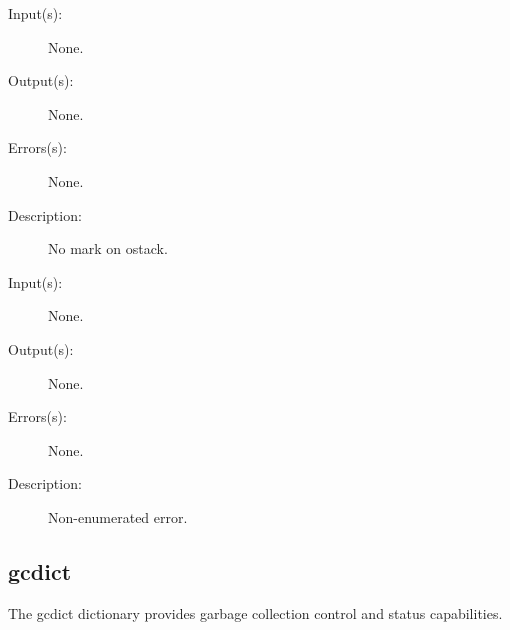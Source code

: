 \begin{description}
\begin{description}
	\item[Input(s): ] None.
	\item[Output(s): ] None.
	\item[Errors(s): ] None.
	\item[Description: ]
		No mark on ostack.
	\end{description}
\label{unregistered}
\label{errordict:unregistered}
\item[{\onyxop{--}{unregistered}{--}}: ]
	\begin{description}\item[]
	\item[Input(s): ] None.
	\item[Output(s): ] None.
	\item[Errors(s): ] None.
	\item[Description: ]
		Non-enumerated error.
	\end{description}
\end{description}

\subsection{gcdict}
\label{sec:gcdict}

The gcdict dictionary provides garbage collection control and status
capabilities.

